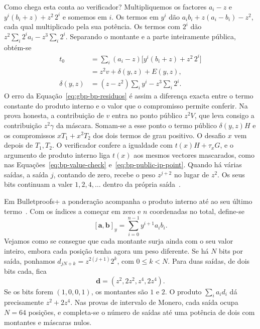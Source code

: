 Como chega esta conta ao verificador? Multipliquemos os factores
\(a_i-z\) e \(y^i(b_i+z)+z^2\,2^i\) e somemos em \(i\). Os termos em
\(y^i\) dão \(a_ib_i+z(a_i-b_i)-z^2\), cada qual multiplicado
pela sua potência. Os termos com \(2^i\) dão \(z^2\sum_i2^ia_i-
z^3\sum_i2^i\). Separando o montante e a parte inteiramente pública,
obtém-se
\begin{align*}
 t_0
   &=\sum_i(a_i-z)\bigl[y^i(b_i+z)+z^2\,2^i\bigr]\\
   &=z^2v+\delta(y,z)+E(y,z),\\
 \delta(y,z)&=(z-z^2)\sum_i y^i-z^3\sum_i2^i .
\end{align*}
O erro da Equação~\eqref{eq:gbp-bp-residuos} é assim a diferença
exacta entre o termo constante do produto interno e o valor que o
compromisso permite conferir. Na prova honesta, a contribuição de
\(v\) entra no ponto público \(z^2V\), que leva consigo a contribuição
\(z^2\gamma\) da máscara. Somam-se a esse ponto o termo público
\(\delta(y,z)H\) e os compromissos \(xT_1+x^2T_2\) dos dois termos
de grau positivo. O desafio \(x\) vem depois de \(T_1,T_2\). O
verificador confere a igualdade com \(t(x)H+\tau_xG\), e o argumento
de produto interno liga \(t(x)\) aos mesmos vectores mascarados, como
nas Equações~\eqref{eq:bp-value-check} e~\eqref{eq:bp-public-ip-point}.
Quando há várias saídas, a saída \(j\), contando de zero, recebe o
peso \(z^{j+2}\) no lugar de \(z^2\). Os seus bits continuam a valer
\(1,2,4,\ldots\) dentro da própria saída~\cite{Bulletproofs_paper}.

Em Bulletproofs+ a ponderação acompanha o produto interno até ao seu
último termo~\cite{bulletproofs-plus-paper}. Com os índices a começar
em zero e \(n\) coordenadas no total, define-se
\[
 [\boldsymbol a,\boldsymbol b]_y
   =\sum_{i=0}^{n-1}y^{i+1}a_i b_i .
\]
Vejamos como se consegue que cada montante surja ainda com o seu
valor inteiro, embora cada posição tenha agora um peso diferente.
Se há \(N\) bits por saída, ponhamos
\(d_{jN+k}=z^{2(j+1)}2^k\), com \(0\le k<N\). Para duas saídas,
de dois bits cada, fica
\[
 \boldsymbol d=(z^2,2z^2,z^4,2z^4).
\]
Se os bits forem \((1,0,0,1)\), os montantes são \(1\) e \(2\).
O produto \(\sum_i a_id_i\) dá precisamente \(z^2+2z^4\).
Nas provas de intervalo de Monero, cada saída ocupa \(N=64\)
posições, e completa-se o número de saídas até uma potência de dois
com montantes e máscaras nulos.

